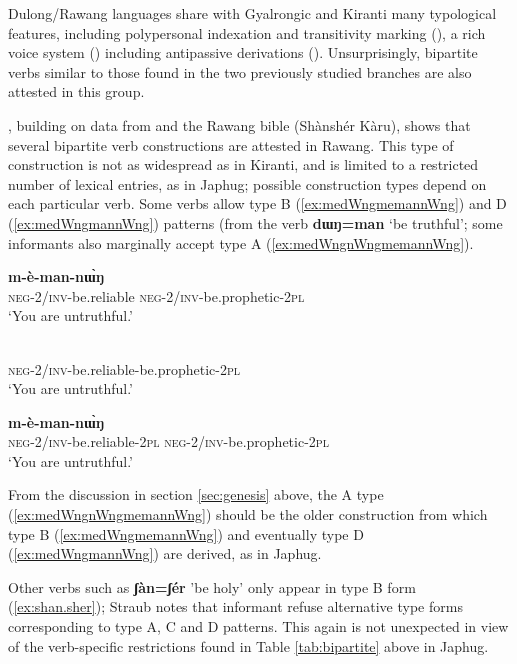 \documentclass[11pt]{article}
\newcommand{\ipa}[1]{{\phon\textbf{#1}}}
\begin{document}
Dulong/Rawang languages share with Gyalrongic and Kiranti many typological features, including polypersonal indexation and transitivity marking (\citealt{lapolla11transitivity}), a rich voice system (\citealt{lapolla01valency}) including antipassive derivations (\citealt{jacques18antipass}). Unsurprisingly, bipartite verbs similar to those found in the two previously studied branches are also attested in this group.

\citet{straub17compounds}, building on data from \citet{lapolla15rawang} and the Rawang bible (Shànshér Kàru), shows that several bipartite verb constructions are attested in Rawang. This type of construction is not as widespread as in Kiranti, and is limited to a restricted number of lexical entries, as in Japhug; possible construction types depend on each particular verb. Some verbs allow type B (\ref{ex:medWngmemannWng}) and D (\ref{ex:medWngmannWng}) patterns (from the verb \ipa{dɯŋ=man} `be truthful'; some informants also marginally accept type A (\ref{ex:medWngnWngmemannWng}).

\begin{exe}
\ex \label{ex:medWngmemannWng}
 \gll \ipa{m-è-dɯŋ} \ipa{m-è-man-nɯ̀ŋ} \\
\textsc{neg-2/inv}-be.reliable	\textsc{neg-2/inv}-be.prophetic-\textsc{2pl} \\
\glt `You are untruthful.'
\end{exe}

\begin{exe}
\ex \label{ex:medWngmannWng}
 \gll \ipa{m-è-dɯŋ-man-nɯ̀ŋ} \\
\textsc{neg-2/inv}-be.reliable-be.prophetic-\textsc{2pl} \\
\glt `You are untruthful.'
\end{exe}

\begin{exe}
\ex \label{ex:medWngnWngmemannWng}
 \gll \ipa{m-è-dɯŋ-nɯ̀ŋ} \ipa{m-è-man-nɯ̀ŋ} \\
\textsc{neg-2/inv}-be.reliable-\textsc{2pl}	\textsc{neg-2/inv}-be.prophetic-\textsc{2pl} \\
\glt `You are untruthful.'
\end{exe}

From the discussion in section \ref{sec:genesis} above, the A type (\ref{ex:medWngnWngmemannWng}) should be the older construction from which type B (\ref{ex:medWngmemannWng}) and eventually type D (\ref{ex:medWngmannWng}) are derived, as in Japhug.

Other verbs such as  \ipa{ʃàn=ʃér} 'be holy' only appear in type B form (\ref{ex:shan.sher}); Straub notes that informant refuse alternative type forms corresponding to type A, C and D patterns. This again is not unexpected in view of the verb-specific restrictions found in Table \ref{tab:bipartite} above in Japhug.
\end{document}
